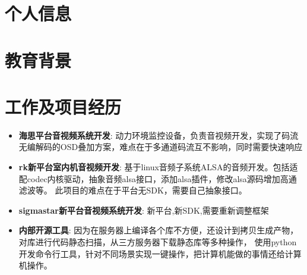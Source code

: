 \documentclass{resume}
\begin{document}


\section{个人信息}
 
\section{教育背景}

\section{工作及项目经历}

\begin{itemize}[parsep=0.2ex]
  \item \textbf{海思平台音视频系统开发}: \newline
    动力环境监控设备，负责音视频开发，实现了码流无编解码的OSD叠加方案，难点在于多通道码流互不影响，同时需要快速响应
  \item \textbf{rk新平台室内机音视频开发}: \newline
    基于linux音频子系统ALSA的音频开发。包括适配codec内核驱动，抽象音频alsa接口，添加alsa插件，修改alsa源码增加高通滤波等。
    此项目的难点在于平台无SDK，需要自己抽象接口。
  \item \textbf{sigmastar新平台音视频系统开发}:\newline
    新平台,新SDK,需要重新调整框架
  \item \textbf{内部开源工具}:\newline
    因为在服务器上编译各个库不方便，还设计到拷贝生成产物，对库进行代码静态扫描，从三方服务器下载静态库等多种操作，
    使用python开发命令行工具，针对不同场景实现一键操作，把计算机能做的事情还给计算机操作。
\end{itemize}
\end{document}
